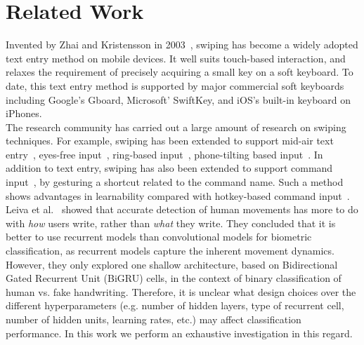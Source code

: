 \documentclass[11pt,oneside,a4paper,openright]{book}
\begin{document}
\chapter{Related Work}

Invented by Zhai and Kristensson in 2003~\cite{Zhai03},
swiping has become a widely adopted text entry method on mobile devices.
It well suits touch-based interaction, and relaxes the requirement of precisely acquiring a small key on a soft keyboard.
To date, this text entry method is supported by major commercial soft keyboards
including Google's Gboard, Microsoft' SwiftKey, and iOS's built-in keyboard on iPhones.\\

The research community has carried out a large amount of research on swiping techniques.
For example, swiping has been extended to support mid-air text entry~\cite{Markussen:2014:VMW}, eyes-free input~\cite{zhu2019sfree}, ring-based input~\cite{gupta2019rotoswype}, phone-tilting based input~\cite{yeo2017investigating}.
In addition to text entry, swiping has also been extended to support command input~\cite{kristensson2007command, alvina2017commandboard, cui2019hotstrokes},
by gesturing a shortcut related to the command name.
Such a method shows advantages in learnability compared with hotkey-based command input~\cite{cui2019hotstrokes}.\\

Leiva et al.~\cite{Leiva20_biometrics} showed that accurate detection of human movements
has more to do with \emph{how} users write, rather than \emph{what} they write.
They concluded that it is better to use recurrent models than convolutional models for biometric classification,
as recurrent models capture the inherent movement dynamics.
However, they only explored one shallow architecture,
based on Bidirectional Gated Recurrent Unit (BiGRU) cells,
in the context of binary classification of human vs. fake handwriting.
Therefore, it is unclear what design choices over the different hyperparameters
(e.g. number of hidden layers, type of recurrent cell, number of hidden units, learning rates, etc.)
may affect classification performance.
In this work we perform an exhaustive investigation in this regard.
\end{document}

